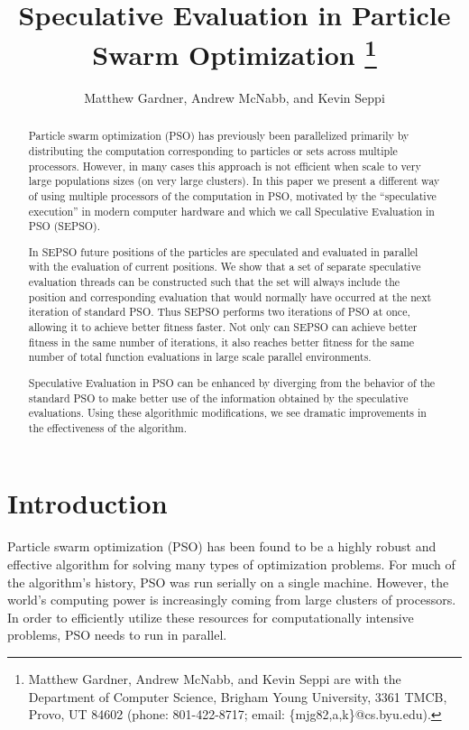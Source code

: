 \documentclass[journal,letterpaper]{IEEEtran}
\title{\ \\ \LARGE\bf Speculative Evaluation in Particle Swarm Optimization%
\thanks{Matthew Gardner, Andrew McNabb, and Kevin Seppi are with the Department
of Computer Science, Brigham Young University, 3361 TMCB, Provo, UT 84602
(phone: 801-422-8717; email: \{mjg82,a,k\}@cs.byu.edu).}%
}
\date{}
\author{Matthew Gardner, Andrew McNabb, and Kevin Seppi}
\begin{document}
\maketitle

\begin{abstract}

Particle swarm optimization (PSO) has previously been parallelized primarily by 
distributing the computation corresponding to particles or sets
across multiple processors.  However, in many cases this approach is not efficient when scale to 
very large populations sizes (on very large clusters).
In this paper we present a different way of using multiple processors of the 
computation in PSO, motivated by the ``speculative execution'' in modern computer hardware and which we call
Speculative Evaluation in PSO (SEPSO).

In SEPSO future positions of the particles are
speculated and evaluated in parallel with the evaluation of current positions.
We show that a set of separate speculative evaluation threads can be constructed
such that the set will always include the position and corresponding
evaluation that would normally have occurred at the next iteration of standard PSO.
Thus SEPSO performs two
iterations of PSO at once, allowing it to achieve better fitness faster.
Not only can SEPSO can achieve better fitness in the same number of iterations,
it also reaches better fitness for the same number of total function evaluations
in large scale parallel environments.

Speculative Evaluation in PSO can be enhanced by diverging from the
behavior of the standard PSO to make better use of the information
obtained by the speculative evaluations.
Using these algorithmic modifications, we see dramatic improvements in the
effectiveness of the algorithm. 
\end{abstract}

\section{Introduction}
\label{sec:intro}

Particle swarm optimization (PSO) has been found to be a highly robust and
effective algorithm for solving many types of optimization problems.  For much
of the algorithm's history, PSO was run serially on a single machine.  However,
the world's computing power is increasingly coming from large clusters of
processors.
In order to efficiently utilize these resources for
computationally intensive problems, PSO needs to run in parallel.
\end{document}
